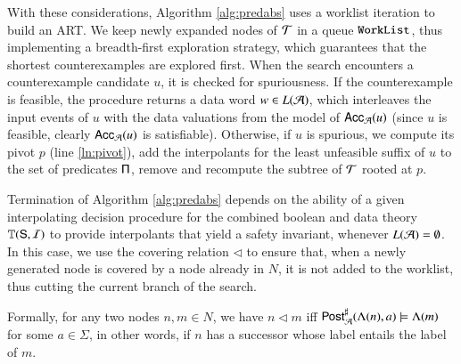 \documentclass[10pt,conference,letterpaper,twocolumn]{IEEEtran}
\begin{document}
With these considerations, Algorithm \ref{alg:predabs} uses a worklist
iteration to build an ART. We keep newly expanded nodes of $\mathcal{T}$ in a
queue $\mathtt{WorkList}$, thus implementing a breadth-first exploration
strategy, which guarantees that the shortest counterexamples are
explored first. When the search encounters a counterexample candidate
$u$, it is checked for spuriousness. If the counterexample is
feasible, the procedure returns a data word $w \in L(\mathcal{A})$, which
interleaves the input events of $u$ with the data valuations from the
model of $\mathsf{Acc}_{\mathcal{A}}(u)$ (since $u$ is feasible, clearly
$\mathsf{Acc}_{\mathcal{A}}(u)$ is satisfiable). Otherwise, if $u$ is spurious, we
compute its pivot $p$ (line \ref{ln:pivot}), add the interpolants for
the least unfeasible suffix of $u$ to the set of predicates $\mathsf{\Pi}$,
remove and recompute the subtree of $\mathcal{T}$ rooted at $p$.

Termination of Algorithm \ref{alg:predabs} depends on the ability of a
given interpolating decision procedure for the combined boolean and
data theory $\mathbb{T}(\mathsf{S},\mathcal{I})$ to provide interpolants that yield a
safety invariant, whenever $L(\mathcal{A}) = \emptyset$. In this case, we use
the covering relation $\lhd$ to ensure that, when a newly generated
node is covered by a node already in $N$, it is not added to the
worklist, thus cutting the current branch of the search. 

Formally, for any two nodes $n,m \in N$, we have $n \lhd m$ iff
${\mathsf{Post}}^\sharp_{\mathcal{A}}(\Lambda(n),a) \models \Lambda(m)$ for some $a \in
\Sigma$, in other words, if $n$ has a successor whose label entails
the label of $m$.
\end{document}
